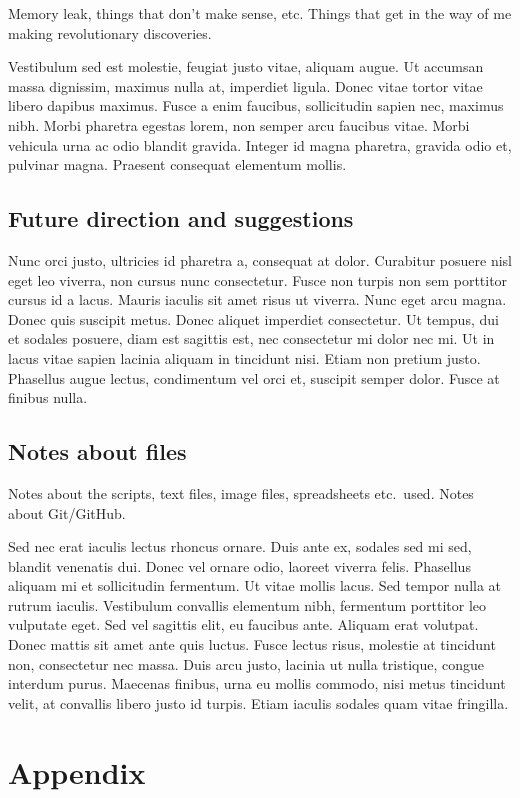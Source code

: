 \documentclass[parskip=full]{scrreprt}
\begin{document}
Memory leak, things that don't make sense, etc. Things that get in the way of me making revolutionary discoveries.

Vestibulum sed est molestie, feugiat justo vitae, aliquam augue. Ut accumsan massa dignissim, maximus nulla at, imperdiet ligula. Donec vitae tortor vitae libero dapibus maximus. Fusce a enim faucibus, sollicitudin sapien nec, maximus nibh. Morbi pharetra egestas lorem, non semper arcu faucibus vitae. Morbi vehicula urna ac odio blandit gravida. Integer id magna pharetra, gravida odio et, pulvinar magna. Praesent consequat elementum mollis.

\section{Future direction and suggestions}
\label{sec:future}

Nunc orci justo, ultricies id pharetra a, consequat at dolor. Curabitur posuere nisl eget leo viverra, non cursus nunc consectetur. Fusce non turpis non sem porttitor cursus id a lacus. Mauris iaculis sit amet risus ut viverra. Nunc eget arcu magna. Donec quis suscipit metus. Donec aliquet imperdiet consectetur. Ut tempus, dui et sodales posuere, diam est sagittis est, nec consectetur mi dolor nec mi. Ut in lacus vitae sapien lacinia aliquam in tincidunt nisi. Etiam non pretium justo. Phasellus augue lectus, condimentum vel orci et, suscipit semper dolor. Fusce at finibus nulla.

\section{Notes about files}
\label{sec:files}

Notes about the scripts, text files, image files, spreadsheets etc.\ used. Notes about Git/GitHub.

Sed nec erat iaculis lectus rhoncus ornare. Duis ante ex, sodales sed mi sed, blandit venenatis dui. Donec vel ornare odio, laoreet viverra felis. Phasellus aliquam mi et sollicitudin fermentum. Ut vitae mollis lacus. Sed tempor nulla at rutrum iaculis. Vestibulum convallis elementum nibh, fermentum porttitor leo vulputate eget. Sed vel sagittis elit, eu faucibus ante. Aliquam erat volutpat. Donec mattis sit amet ante quis luctus. Fusce lectus risus, molestie at tincidunt non, consectetur nec massa. Duis arcu justo, lacinia ut nulla tristique, congue interdum purus. Maecenas finibus, urna eu mollis commodo, nisi metus tincidunt velit, at convallis libero justo id turpis. Etiam iaculis sodales quam vitae fringilla. 

\chapter*{Appendix}
\label{ch:appendix}



\nocite{*}
\printbibliography
\end{document}
